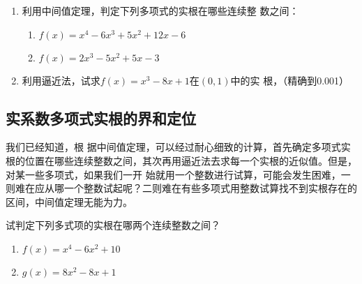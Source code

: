 \begin{ex}
\begin{enumerate}
    \item 利用中间值定理，判定下列多项式的实根在哪些连续整
数之间：
\begin{enumerate}
    \item $f (x) =x^4-6x^3+5x^2+12x-6$
    \item $f (x) =2x^3-5x^2+5x-3$
\end{enumerate}
\item 利用逼近法，试求$f(x)=x^3-8x+1$在$(0, 1)$中的实
根，（精确到0.001）
\end{enumerate}
\end{ex}

\subsection{实系数多项式实根的界和定位}

我们已经知道，根
据中间值定理，可以经过耐心细致的计算，首先确定多项式实根的位置在哪些连续整数之间，其次再用逼近法去求每一个实根的近似值。但是，对某一些多项式，如果我们一开
始就用一个整数进行试算，可能会发生困难，一则难在应从哪一个整数试起呢？二则难在有些多项式用整数试算找不到实根存在的区间，中间值定理无能为力。

\begin{example}
   试判定下列多式项的实根在哪两个连续整数之间？
\begin{multicols}{2}
 \begin{enumerate}
     \item $f (x) =x^4-6x^2+10$
     \item $g(x)=8x^2-8x+1$
 \end{enumerate}
\end{multicols}
\end{example}

